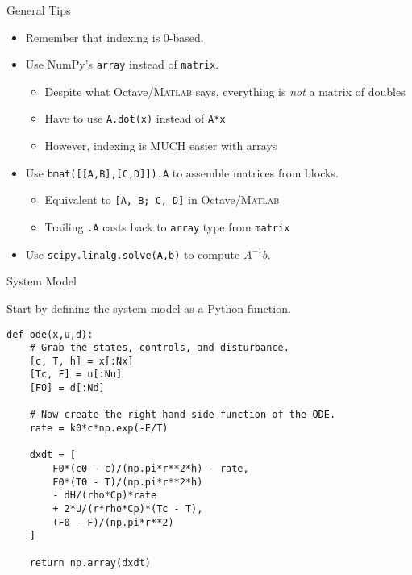 \documentclass[xcolor=dvipsnames]{beamer}
\begin{document}
\begin{frame}{General Tips}
    \begin{itemize}
        \item Remember that indexing is 0-based.
        \item Use NumPy's \texttt{array} instead of \texttt{matrix}.
        \begin{itemize}
            \item Despite what Octave/\textsc{Matlab} says, everything is \emph{not} a matrix of doubles
            \item Have to use \texttt{A.dot(x)} instead of \texttt{A*x}
            \item However, indexing is MUCH easier with arrays
        \end{itemize}
        \item Use \texttt{bmat([[A,B],[C,D]]).A} to assemble matrices from blocks.
        \begin{itemize}
            \item Equivalent to \texttt{[A, B; C, D]} in Octave/\textsc{Matlab}
            \item Trailing \texttt{.A} casts back to \texttt{array} type from \texttt{matrix}
        \end{itemize}
        \item Use \texttt{scipy.linalg.solve(A,b)} to compute $A^{-1}b$.
    \end{itemize}
\end{frame}

\begin{frame}[fragile]{System Model}

Start by defining the system model as a Python function.

\begin{lstlisting}[style=python]
def ode(x,u,d):
    # Grab the states, controls, and disturbance.
    [c, T, h] = x[:Nx]
    [Tc, F] = u[:Nu]
    [F0] = d[:Nd]
    
    # Now create the right-hand side function of the ODE.
    rate = k0*c*np.exp(-E/T)
    
    dxdt = [
        F0*(c0 - c)/(np.pi*r**2*h) - rate,
        F0*(T0 - T)/(np.pi*r**2*h)
        - dH/(rho*Cp)*rate
        + 2*U/(r*rho*Cp)*(Tc - T),
        (F0 - F)/(np.pi*r**2)
    ]
    
    return np.array(dxdt)
\end{lstlisting}
\end{frame}
\end{document}
